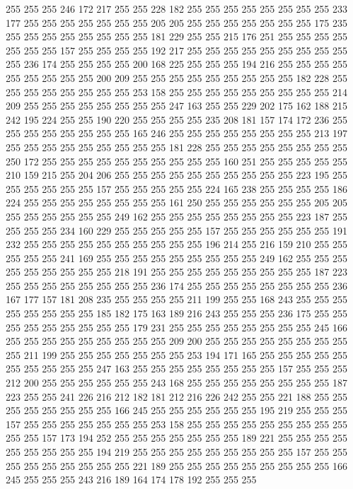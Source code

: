 255 255 255 246 172 217 255 255 228 182 255 255 255 255 255 255 255 255 233 177
255 255 255 255 255 255 255 205 205 255 255 255 255 255 255 255 175 235 255 255
255 255 255 255 255 255 181 229 255 255 215 176 251 255 255 255 255 255 255 255
157 255 255 255 255 192 217 255 255 255 255 255 255 255 255 255 255 236 174 255
255 255 255 200 168 225 255 255 255 194 216 255 255 255 255 255 255 255 255 255
200 209 255 255 255 255 255 255 255 255 255 182 228 255 255 255 255 255 255 255
255 253 158 255 255 255 255 255 255 255 255 255 214 209 255 255 255 255 255 255
255 255 247 163 255 255 229 202 175 162 188 215 242 195 224 255 255 190 220 255
255 255 255 235 208 181 157 174 172 236 255 255 255 255 255 255 255 255 165 246
255 255 255 255 255 255 255 255 213 197 255 255 255 255 255 255 255 255 255 181
228 255 255 255 255 255 255 255 255 250 172 255 255 255 255 255 255 255 255 255
255 160 251 255 255 255 255 255 210 159 215 255 204 206 255 255 255 255 255 255
255 255 255 255 223 195 255 255 255 255 255 255 157 255 255 255 255 255 224 165
238 255 255 255 255 186 224 255 255 255 255 255 255 255 255 161 250 255 255 255
255 255 255 205 205 255 255 255 255 255 255 249 162 255 255 255 255 255 255 255
255 223 187 255 255 255 255 234 160 229 255 255 255 255 255 157 255 255 255 255
255 255 191 232 255 255 255 255 255 255 255 255 255 255 196 214 255 216 159 210
255 255 255 255 255 241 169 255 255 255 255 255 255 255 255 255 249 162 255 255
255 255 255 255 255 255 255 218 191 255 255 255 255 255 255 255 255 255 187 223
255 255 255 255 255 255 255 255 236 174 255 255 255 255 255 255 255 255 236 167
177 157 181 208 235 255 255 255 255 211 199 255 255 168 243 255 255 255 255 255
255 255 255 185 182 175 163 189 216 243 255 255 255 236 175 255 255 255 255 255
255 255 255 255 179 231 255 255 255 255 255 255 255 255 245 166 255 255 255 255
255 255 255 255 255 209 200 255 255 255 255 255 255 255 255 255 211 199 255 255
255 255 255 255 255 253 194 171 165 255 255 255 255 255 255 255 255 255 255 247
163 255 255 255 255 255 255 255 255 157 255 255 255 212 200 255 255 255 255 255
255 243 168 255 255 255 255 255 255 255 255 187 223 255 255 241 226 216 212 182
181 212 216 226 242 255 255 221 188 255 255 255 255 255 255 255 255 166 245 255
255 255 255 255 255 195 219 255 255 255 157 255 255 255 255 255 255 255 253 158
255 255 255 255 255 255 255 255 255 255 255 157 173 194 252 255 255 255 255 255
255 255 189 221 255 255 255 255 255 255 255 255 255 194 219 255 255 255 255 255
255 255 255 255 157 255 255 255 255 255 255 255 255 255 221 189 255 255 255 255
255 255 255 255 255 166 245 255 255 255 243 216 189 164 174 178 192 255 255 255
